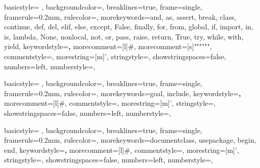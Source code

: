 {
    basicstyle= \ttfamily{}, %
    backgroundcolor=\color{background}, %
    breaklines=true, %
    frame=single,
    framerule=0.2mm, %
    rulecolor=\color{gray}, %
    morekeywords={and, as, assert, break, class, continue, def, del, elif, else, except, False, finally, for, from, global, if, import, in, is, lambda, None, nonlocal, not, or, pass, raise, return, True, try, while, with, yield},
    keywordstyle=\color{blue}\textbf,
    morecomment=[l]{\#},
    morecomment=[s]{"""}{"""},
    commentstyle=\color{comment},
    morestring=[m]', %
    stringstyle=\color{string},
    showstringspaces=false,
    numbers=left,
    numberstyle={\ttfamily{}\color{gray}}, %
}

{
    basicstyle= \ttfamily{}, %
    backgroundcolor=\color{background}, %
    breaklines=true, %
    frame=single,
    framerule=0.2mm, %
    rulecolor=\color{gray}, %
    morekeywords={goal, include},
    keywordstyle=\color{blue}\textbf,
    morecomment=[l]{\#},
    commentstyle=\color{comment},
    morestring=[m]', %
    stringstyle=\color{string},
    showstringspaces=false,
    numbers=left,
    numberstyle={\ttfamily{}\color{gray}}, %
}

{
    basicstyle= \ttfamily{}, %
    backgroundcolor=\color{background}, %
    breaklines=true, %
    frame=single,
    framerule=0.2mm, %
    rulecolor=\color{gray}, %
    morekeywords={documentclass, usepackage, begin, end},
    keywordstyle=\color{blue}\textbf,
    morecomment=[l]{\#},
    commentstyle=\color{comment},
    morestring=[m]', %
    stringstyle=\color{string},
    showstringspaces=false,
    numbers=left,
    numberstyle={\ttfamily{}\color{gray}}, %
}

